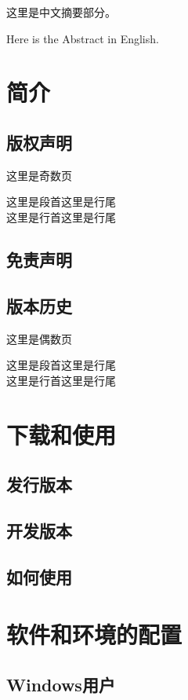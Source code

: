 \documentclass[bachelor]{buaathesis}
\begin{document}
\maketitle
\tableofcontents
\begin{cabstract}
这里是中文摘要部分。
\end{cabstract}
\begin{eabstract}
Here is the Abstract in English.
\end{eabstract}
\mainmatter
\chapter{简介}
	\section{版权声明}
	这里是奇数页\par
	这里是段首\hfill 这里是行尾\\
	这里是行首\hfill 这里是行尾\\
	\section{免责声明}
	\newpage
	\section{版本历史}
	这里是偶数页\par
	这里是段首\hfill 这里是行尾\\
	这里是行首\hfill 这里是行尾\\
	
\chapter{下载和使用}
	\section{发行版本}
	\section{开发版本}
	\section{如何使用}
	
\chapter{软件和环境的配置}
	\section{Windows用户}
\end{document}

